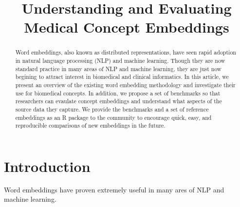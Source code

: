 \documentclass{article}
\begin{document}
\title{Understanding and Evaluating Medical Concept Embeddings}





\begin{abstract}
Word embeddings, also known as distributed representations, have seen rapid adoption in natural language processing (NLP) and machine learning. Though they are now standard practice in many areas of NLP and machine learning, they are just now begining to attract interest in biomedical and clinical informatics. In this article, we present an overview of the existing word embedding methodology and investigate their use for biomedical concepts. In addition, we propose a set of benchmarks so that researchers can evaulate concept embeddings and understand what aspects of the source data they capture. We provide the benchmarks and a set of reference embeddings as an R package to the community to encourage quick, easy, and reproducible comparisons of new embeddings in the future.
\end{abstract}



\section{Introduction}\label{aba:intro}
Word embeddings have proven extremely useful in many ares of NLP and machine learning. 
\end{document}
